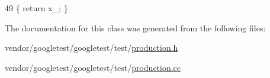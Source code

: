 \begin{DoxyCode}
49 \{ \textcolor{keywordflow}{return} x\_; \}
\end{DoxyCode}


The documentation for this class was generated from the following files\+:\begin{DoxyCompactItemize}
\item 
vendor/googletest/googletest/test/\hyperlink{production_8h}{production.\+h}\item 
vendor/googletest/googletest/test/\hyperlink{production_8cc}{production.\+cc}\end{DoxyCompactItemize}
